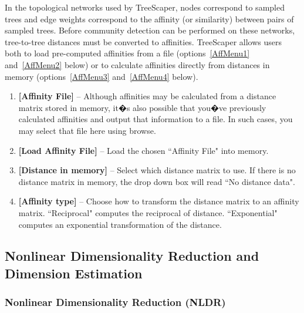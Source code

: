 \documentclass[11pt]{article}
\begin{document}
In the topological networks used by TreeScaper, nodes correspond to sampled trees and edge
weights correspond to the affinity (or similarity) between pairs of sampled trees. Before
community detection can be performed on these networks, tree-to-tree distances must be
converted to affinities. TreeScaper allows users both to load pre-computed affinities from a
file (options~\ref{AffMenu1} and~\ref{AffMenu2} below) or to calculate affinities directly from distances in memory (options~\ref{AffMenu3} and~\ref{AffMenu4} below). \\

\begin{enumerate}[{\bf 1-}]
\item {\bf [Affinity File]} -- Although affinities may be calculated from a distance matrix stored in
memory, it�s also possible that you�ve previously calculated affinities and output that
information to a file. In such cases, you may select that file here using browse. \label{AffMenu1}

\item {\bf [Load Affinity File]} -- Load the chosen ``Affinity File" into memory. \label{AffMenu2}

\item {\bf [Distance in memory]} -- Select which distance matrix to use. If there is no distance matrix
in memory, the drop down box will read ``No distance data". \label{AffMenu3}

\item {\bf [Affinity type]} -- Choose how to transform the distance matrix to an affinity matrix.
``Reciprocal" computes the reciprocal of distance. ``Exponential" computes an exponential
transformation of the distance. \label{AffMenu4}
\end{enumerate}

\newpage
\subsection{Nonlinear Dimensionality Reduction and Dimension Estimation}\label{subsect:DimEstNLDR}


\subsubsection{Nonlinear Dimensionality Reduction (NLDR)}\label{subsubsect:NLDR}
\end{document}
